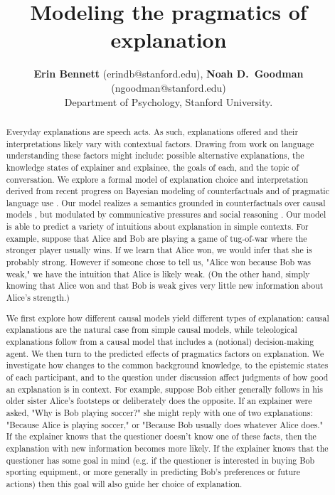 \documentclass[10pt,letterpaper]{article}
\title{Modeling the pragmatics of explanation}
\author{{\large \bf Erin Bennett} (erindb@stanford.edu), {\large \bf Noah D.~Goodman} (ngoodman@stanford.edu)\\
  Department of Psychology, Stanford University.}
\begin{document}
\maketitle

\begin{abstract}

Everyday explanations are speech acts. As such, explanations offered and their interpretations likely vary with contextual factors. Drawing from work on language understanding these factors might include: possible alternative explanations, the knowledge states of explainer and explainee, the goals of each, and the topic of conversation. We explore a formal model of explanation choice and interpretation derived from recent progress on Bayesian modeling of counterfactuals \cite{LucasKemp2015} and of pragmatic language use \cite{FrankGoodman2012, GoodmanStuhlmuller2013}. Our model realizes a semantics grounded in counterfactuals over causal models \cite{Lewis1973}, but modulated by communicative pressures and social reasoning \cite{Grice1970, Lewis1969}. Our model is able to predict a variety of intuitions about explanation in simple contexts. For example, suppose that Alice and Bob are playing a game of tug-of-war where the stronger player usually wins. If we learn that Alice won, we would infer that she is probably strong. However if someone chose to tell us, "Alice won because Bob was weak," we have the intuition that Alice is likely weak. (On the other hand, simply knowing that Alice won and that Bob is weak gives very little new information about Alice's strength.)

We first explore how different causal models yield different types of explanation: causal explanations are the natural case from simple causal models, while teleological explanations follow from a causal model that includes a (notional) decision-making agent. We then turn to the predicted effects of pragmatics factors on explanation. We investigate how changes to the common background knowledge, to the epistemic states of each participant, and to the question under discussion affect judgments of how good an explanation is in context. For example, suppose Bob either generally follows in his older sister Alice’s footsteps or deliberately does the opposite. If an explainer were asked, "Why is Bob playing soccer?" she might reply with one of two explanations: "Because Alice is playing soccer," or "Because Bob usually does whatever Alice does." If the explainer knows that the questioner doesn't know one of these facts, then the explanation with new information becomes more likely. If the explainer knows that the questioner has some goal in mind (e.g. if the questioner is interested in buying Bob sporting equipment, or more generally in predicting Bob’s preferences or future actions) then this goal will also guide her choice of explanation.


\end{abstract}
\end{document}
